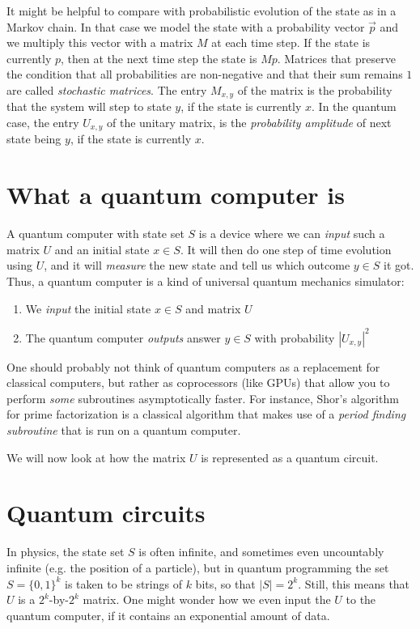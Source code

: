 It might be helpful to compare with probabilistic evolution of the state as in a Markov chain.
In that case we model the state with a probability vector $\vec{p}$ and we multiply this vector with a matrix $M$ at each time step.
If the state is currently $p$, then at the next time step the state is $Mp$.
Matrices that preserve the condition that all probabilities are non-negative and that their sum remains $1$ are called \emph{stochastic matrices}.
The entry $M_{x,y}$ of the matrix is the probability that the system will step to state $y$, if the state is currently $x$.
In the quantum case, the entry $U_{x,y}$ of the unitary matrix, is the \emph{probability amplitude} of next state being $y$, if the state is currently $x$.

\section{What a quantum computer is}

A quantum computer with state set $S$ is a device where we can \emph{input} such a matrix $U$ and an initial state $x \in S$.
It will then do one step of time evolution using $U$, and it will \emph{measure} the new state and tell us which outcome $y \in S$ it got.
Thus, a quantum computer is a kind of universal quantum mechanics simulator:
\begin{enumerate}
  \item We \emph{input} the initial state $x \in S$ and matrix $U$
  \item The quantum computer \emph{outputs} answer $y \in S$ with probability $|U_{x,y}|^2$
\end{enumerate}

One should probably not think of quantum computers as a replacement for classical computers,
but rather as coprocessors (like GPUs) that allow you to perform \emph{some} subroutines asymptotically faster.
For instance, Shor's algorithm for prime factorization is a classical algorithm that makes use of a \emph{period finding subroutine} that is run on a quantum computer.

We will now look at how the matrix $U$ is represented as a quantum circuit.

\section{Quantum circuits}

In physics, the state set $S$ is often infinite, and sometimes even uncountably infinite (e.g. the position of a particle),
but in quantum programming the set $S = \{0,1\}^k$ is taken to be strings of $k$ bits, so that $|S| = 2^k$.
Still, this means that $U$ is a $2^k$-by-$2^k$ matrix. One might wonder how we even input the $U$ to the quantum computer, if it contains an exponential amount of data.

